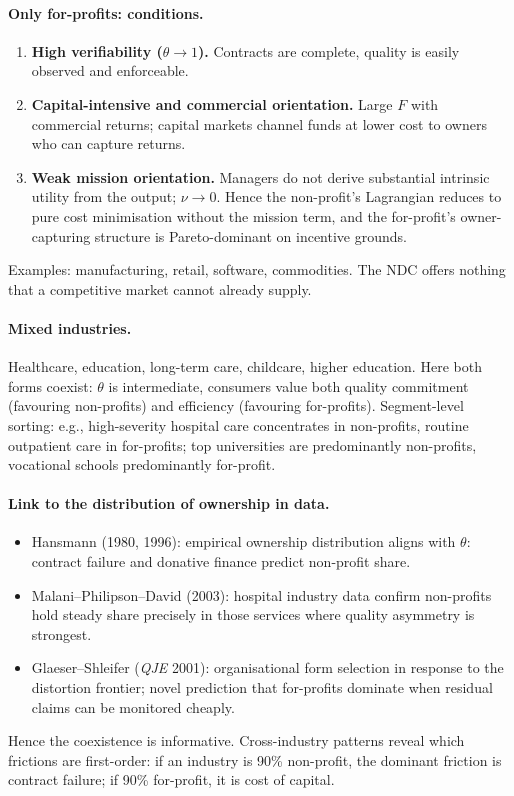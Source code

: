 \documentclass[11pt,a4paper]{article}
\begin{document}
\paragraph{Only for-profits: conditions.}
\begin{enumerate}[leftmargin=*,itemsep=1pt]
    \item \textbf{High verifiability ($\theta\to 1$).} Contracts are complete, quality is easily observed and enforceable.
    \item \textbf{Capital-intensive and commercial orientation.} Large $F$ with commercial returns; capital markets channel funds at lower cost to owners who can capture returns.
    \item \textbf{Weak mission orientation.} Managers do not derive substantial intrinsic utility from the output; $\nu\to 0$. Hence the non-profit's Lagrangian reduces to pure cost minimisation without the mission term, and the for-profit's owner-capturing structure is Pareto-dominant on incentive grounds.
\end{enumerate}
Examples: manufacturing, retail, software, commodities. The NDC offers nothing that a competitive market cannot already supply.

\paragraph{Mixed industries.}
Healthcare, education, long-term care, childcare, higher education. Here both forms coexist: $\theta$ is intermediate, consumers value both quality commitment (favouring non-profits) and efficiency (favouring for-profits). Segment-level sorting: e.g., high-severity hospital care concentrates in non-profits, routine outpatient care in for-profits; top universities are predominantly non-profits, vocational schools predominantly for-profit.

\paragraph{Link to the distribution of ownership in data.}
\begin{itemize}[leftmargin=*,itemsep=1pt]
    \item Hansmann (1980, 1996): empirical ownership distribution aligns with $\theta$: contract failure and donative finance predict non-profit share.
    \item Malani--Philipson--David (2003): hospital industry data confirm non-profits hold steady share precisely in those services where quality asymmetry is strongest.
    \item Glaeser--Shleifer (\emph{QJE} 2001): organisational form selection in response to the distortion frontier; novel prediction that for-profits dominate when residual claims can be monitored cheaply.
\end{itemize}
Hence the coexistence is informative. Cross-industry patterns reveal which frictions are first-order: if an industry is 90\% non-profit, the dominant friction is contract failure; if 90\% for-profit, it is cost of capital.
\end{document}
